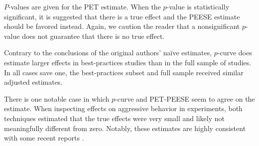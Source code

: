 \documentclass[man]{apa6}
\begin{document}
$P$-values are given for the PET estimate. When the $p$-value is statistically significant, it is suggested that there is a true effect and the PEESE estimate should be favored instead. Again, we caution the reader that a nonsignificant $p$-value does not guarantee that there is no true effect.  

Contrary to the conclusions of the original authors' na{\"i}ve estimates, $p$-curve does estimate larger effects in best-practices studies than in the full sample of studies. In all cases save one, the best-practices subset and full sample received similar adjusted estimates. 


There is one notable case in which $p$-curve and PET-PEESE seem to agree on the estimate. When inspecting effects on aggressive behavior in experiments, both techniques estimated that the true effects were very small and likely not meaningfully different from zero. Notably, these estimates are highly consistent with some recent reports  \citep{Engelhardt:etal:2015,Hilgard:2015,Kneer:etal:inpress,Tear:Nielsen:2014,Przybylski:etal:2014}.


\end{document}
